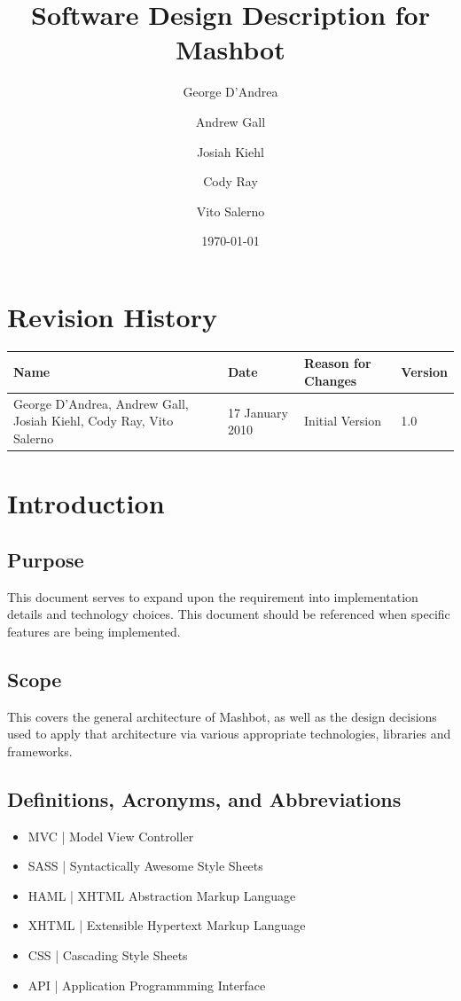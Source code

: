 \documentclass{article}
\begin{document}
\title{Software Design Description for Mashbot} 
\author{George D'Andrea \and Andrew Gall \and Josiah Kiehl \and
  Cody Ray \and Vito Salerno}
\date{\today}
\begin{titlepage}
\maketitle
\end{titlepage}

\section*{Revision History}
\begin{tabular}{|p{2in}|l|l|l|}
  \hline
  \textbf{Name} & \textbf{Date} & \textbf{Reason for Changes} & \textbf{Version} \\
  \hline \hline
  George D'Andrea, Andrew Gall, Josiah Kiehl, Cody Ray, Vito
  Salerno & 17 January 2010 & Initial Version & 1.0 \\
  \hline
\end{tabular}

\clearpage
\tableofcontents
\clearpage

\section{Introduction}
\subsection{Purpose}
This document serves to expand upon the requirement into implementation details and technology choices.  This document should be referenced when specific features are being implemented.
\subsection{Scope}
This covers the general architecture of Mashbot, as well as the design decisions used to apply that architecture via various appropriate technologies, libraries and frameworks.
\subsection{Definitions, Acronyms,   and Abbreviations}
\begin{itemize}
\item MVC | Model View Controller
\item SASS | Syntactically Awesome Style Sheets
\item HAML | XHTML Abstraction Markup Language
\item XHTML | Extensible Hypertext Markup Language
\item CSS | Cascading Style Sheets
\item API | Application Programmming Interface
\end{itemize}
\end{document}
